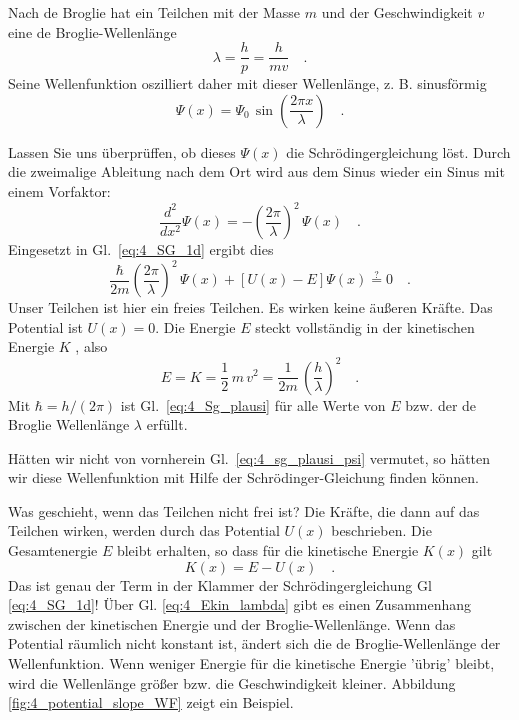 Nach de Broglie hat ein Teilchen mit der Masse $m$ und der Geschwindigkeit $v$ eine de Broglie-Wellenlänge 
\begin{equation}
    \lambda = \frac{h}{p} = \frac{h}{ m v} \quad .
\end{equation}
Seine Wellenfunktion oszilliert daher mit dieser Wellenlänge, z. B. sinusförmig
\begin{equation}
    \Psi(x) = \Psi_0 \, \sin\left( \frac{2 \pi x}{\lambda} \right) \quad .
    \label{eq:4_sg_plausi_psi}
\end{equation}

Lassen Sie uns überprüffen, ob dieses $\Psi(x)$ die Schrödingergleichung löst.
Durch die zweimalige Ableitung nach dem Ort wird aus dem Sinus wieder ein Sinus mit einem Vorfaktor:
\begin{equation}
    \frac{d^2}{dx^2} \Psi(x)  = - \left(\frac{2 \pi}{\lambda} \right)^2 \, \Psi(x) \quad .
\end{equation}
Eingesetzt in Gl.~\ref{eq:4_SG_1d} ergibt dies
\begin{equation}
     \frac{\hbar}{2m}  \left(\frac{2 \pi}{\lambda} \right)^2 \,  \Psi(x) + \left[ U(x) - E \right] \Psi(x) \overset{?}{=} 0 \quad .
     \label{eq:4_Sg_plausi}
\end{equation}
Unser Teilchen ist hier ein freies Teilchen. Es wirken keine äußeren Kräfte. Das Potential ist $U(x) = 0$. Die Energie $E$ steckt vollständig in der kinetischen Energie $K$ , also 
\begin{equation}
    E =  K = \frac{1}{2} \, m \,  v^2 =  \frac{1}{2m} \, \left( \frac{h}{\lambda} \right)^2 \quad .
    \label{eq:4_Ekin_lambda}
\end{equation}
Mit $\hbar = h / (2 \pi)$ ist Gl.~\ref{eq:4_Sg_plausi} für alle Werte von $E$ bzw. der de Broglie Wellenlänge $\lambda$ erfüllt.

Hätten wir nicht von vornherein  Gl.~\ref{eq:4_sg_plausi_psi} vermutet, so hätten wir diese Wellenfunktion mit Hilfe der Schrödinger-Gleichung finden können.

Was geschieht, wenn das Teilchen nicht frei ist? Die Kräfte, die dann auf das Teilchen wirken, werden durch das Potential $U(x)$ beschrieben. Die Gesamtenergie $E$ bleibt erhalten, so dass für die kinetische Energie $K(x)$ gilt
\begin{equation}
    K(x) = E - U(x) \quad .
\end{equation}
Das ist genau der Term in der Klammer der Schrödingergleichung Gl \ref{eq:4_SG_1d}! Über Gl. \ref{eq:4_Ekin_lambda} gibt es einen Zusammenhang zwischen der kinetischen Energie und der Broglie-Wellenlänge. Wenn das Potential räumlich nicht konstant ist, ändert sich die de Broglie-Wellenlänge der Wellenfunktion. Wenn weniger Energie für die kinetische Energie 'übrig' bleibt, wird die Wellenlänge größer bzw. die Geschwindigkeit kleiner. Abbildung  \ref{fig:4_potential_slope_WF} zeigt ein Beispiel.

